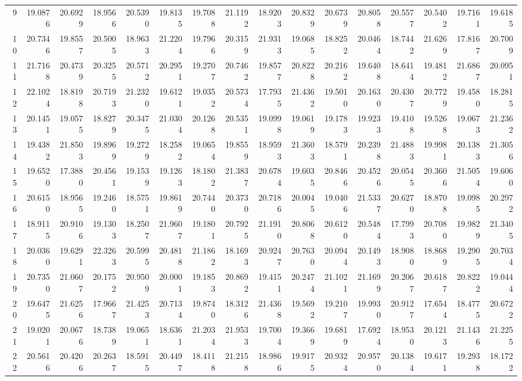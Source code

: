 \documentclass[12pt]{article}\usepackage[]{graphicx}\usepackage[]{color}
\begin{document}
\begin{landscape}
\begin{longtable}[t]{rrrrrrrrrrrrrrrr}
9 & 19.0876 & 20.6929 & 18.9566 & 20.5390 & 19.8135 & 19.7088 & 21.1192 & 18.9203 & 20.8329 & 20.6739 & 20.8058 & 20.5577 & 20.5402 & 19.7161 & 19.6185\\
10 & 20.7346 & 19.8557 & 20.5005 & 18.9633 & 21.2204 & 19.7966 & 20.3159 & 21.9313 & 19.0685 & 18.8252 & 20.0464 & 18.7442 & 21.6269 & 17.8167 & 20.7009\\
11 & 21.7168 & 20.4739 & 20.3255 & 20.5712 & 20.2951 & 19.2707 & 20.7462 & 19.8577 & 20.8228 & 20.2162 & 19.6408 & 18.6414 & 19.4812 & 21.6867 & 20.0951\\
12 & 22.1024 & 18.8198 & 20.7193 & 21.2320 & 19.6121 & 19.0352 & 20.5734 & 17.7935 & 21.4362 & 19.5010 & 20.1630 & 20.4307 & 20.7729 & 19.4580 & 18.2815\\
13 & 20.1451 & 19.0575 & 18.8279 & 20.3475 & 21.0304 & 20.1268 & 20.5351 & 19.0998 & 19.0619 & 19.1783 & 19.9233 & 19.4108 & 19.5268 & 19.0673 & 21.2362\\
14 & 19.4382 & 21.8503 & 19.8969 & 19.2729 & 18.2582 & 19.0654 & 19.8559 & 18.9593 & 21.3603 & 18.5791 & 20.2398 & 21.4883 & 19.9981 & 20.1383 & 21.3056\\
15 & 19.6520 & 17.3880 & 20.4561 & 19.1539 & 19.1263 & 18.1802 & 21.3837 & 20.6784 & 19.6035 & 20.8466 & 20.4526 & 20.0545 & 20.3606 & 21.5054 & 19.6060\\
16 & 20.6150 & 18.9565 & 19.2460 & 18.5751 & 19.8619 & 20.7440 & 20.3730 & 20.7186 & 20.0045 & 19.0406 & 21.5337 & 20.6270 & 18.8708 & 19.0985 & 20.2972\\
17 & 18.9115 & 20.9106 & 19.1303 & 18.2507 & 21.9607 & 19.1801 & 20.7925 & 21.1910 & 20.8068 & 20.6120 & 20.5484 & 17.7993 & 20.7080 & 19.9829 & 21.3405\\
18 & 20.0360 & 19.6291 & 22.3263 & 20.5995 & 20.4818 & 21.1862 & 18.1693 & 20.9247 & 20.7630 & 20.0944 & 20.1493 & 18.9080 & 18.8689 & 19.2905 & 20.7034\\
19 & 20.7350 & 21.0607 & 20.1752 & 20.9509 & 20.0001 & 19.1853 & 20.8692 & 19.4151 & 20.2474 & 21.1021 & 21.1699 & 20.2067 & 20.6187 & 20.8222 & 19.0444\\
20 & 19.6475 & 21.6256 & 17.9667 & 21.4253 & 20.7134 & 19.8740 & 18.3126 & 21.4368 & 19.5692 & 19.2107 & 19.9930 & 20.9127 & 17.6544 & 18.4775 & 20.6722\\
21 & 19.0201 & 20.0676 & 18.7389 & 19.0651 & 18.6361 & 21.2034 & 21.9533 & 19.7004 & 19.3669 & 19.6819 & 17.6924 & 18.9530 & 20.1213 & 21.1436 & 21.2255\\
22 & 20.5616 & 20.4206 & 20.2637 & 18.5915 & 20.4497 & 18.4118 & 21.2158 & 18.9866 & 19.9175 & 20.9324 & 20.9570 & 20.1384 & 19.6171 & 19.2938 & 18.1722\\

\end{longtable}
\end{landscape}
\end{document}
